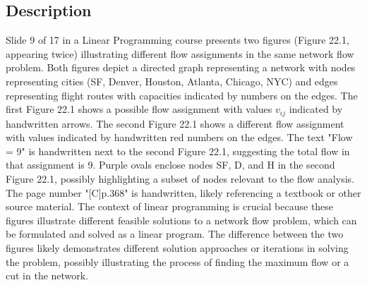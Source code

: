 \documentclass{article}%
\begin{document}
%
\subsection{Description}%
Slide 9 of 17 in a Linear Programming course presents two figures (Figure 22.1, appearing twice) illustrating different flow assignments in the same network flow problem. Both figures depict a directed graph representing a network with nodes representing cities (SF, Denver, Houston, Atlanta, Chicago, NYC) and edges representing flight routes with capacities indicated by numbers on the edges. The first Figure 22.1 shows a possible flow assignment with values $v_{ij}$ indicated by handwritten arrows. The second Figure 22.1 shows a different flow assignment with values indicated by handwritten red numbers on the edges. The text "Flow = 9" is handwritten next to the second Figure 22.1, suggesting the total flow in that assignment is 9. Purple ovals enclose nodes SF, D, and H in the second Figure 22.1, possibly highlighting a subset of nodes relevant to the flow analysis. The page number "[C]p.368" is handwritten, likely referencing a textbook or other source material. The context of linear programming is crucial because these figures illustrate different feasible solutions to a network flow problem, which can be formulated and solved as a linear program. The difference between the two figures likely demonstrates different solution approaches or iterations in solving the problem, possibly illustrating the process of finding the maximum flow or a cut in the network.%
\end{document}
